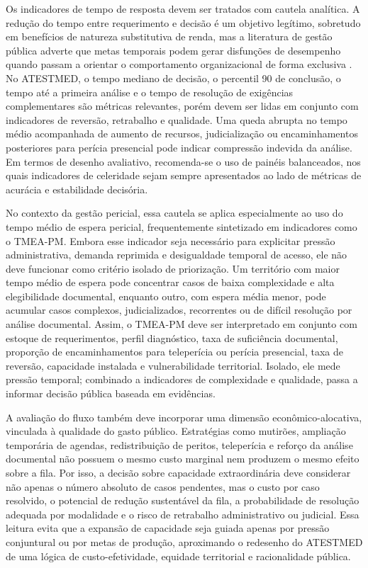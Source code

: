\documentclass[12pt,a4paper]{article}
\begin{document}
Os indicadores de tempo de resposta devem ser tratados com cautela analítica. A redução do tempo entre requerimento e decisão é um objetivo legítimo, sobretudo em benefícios de natureza substitutiva de renda, mas a literatura de gestão pública adverte que metas temporais podem gerar disfunções de desempenho quando passam a orientar o comportamento organizacional de forma exclusiva \parencite{kelman2009performanceimprovementandperformancedysfunctionanemp}. No ATESTMED, o tempo mediano de decisão, o percentil 90 de conclusão, o tempo até a primeira análise e o tempo de resolução de exigências complementares são métricas relevantes, porém devem ser lidas em conjunto com indicadores de reversão, retrabalho e qualidade. Uma queda abrupta no tempo médio acompanhada de aumento de recursos, judicialização ou encaminhamentos posteriores para perícia presencial pode indicar compressão indevida da análise. Em termos de desenho avaliativo, recomenda-se o uso de painéis balanceados, nos quais indicadores de celeridade sejam sempre apresentados ao lado de métricas de acurácia e estabilidade decisória.

No contexto da gestão pericial, essa cautela se aplica especialmente ao uso do tempo médio de espera pericial, frequentemente sintetizado em indicadores como o TMEA-PM. Embora esse indicador seja necessário para explicitar pressão administrativa, demanda reprimida e desigualdade temporal de acesso, ele não deve funcionar como critério isolado de priorização. Um território com maior tempo médio de espera pode concentrar casos de baixa complexidade e alta elegibilidade documental, enquanto outro, com espera média menor, pode acumular casos complexos, judicializados, recorrentes ou de difícil resolução por análise documental. Assim, o TMEA-PM deve ser interpretado em conjunto com estoque de requerimentos, perfil diagnóstico, taxa de suficiência documental, proporção de encaminhamentos para teleperícia ou perícia presencial, taxa de reversão, capacidade instalada e vulnerabilidade territorial. Isolado, ele mede pressão temporal; combinado a indicadores de complexidade e qualidade, passa a informar decisão pública baseada em evidências.

A avaliação do fluxo também deve incorporar uma dimensão econômico-alocativa, vinculada à qualidade do gasto público. Estratégias como mutirões, ampliação temporária de agendas, redistribuição de peritos, teleperícia e reforço da análise documental não possuem o mesmo custo marginal nem produzem o mesmo efeito sobre a fila. Por isso, a decisão sobre capacidade extraordinária deve considerar não apenas o número absoluto de casos pendentes, mas o custo por caso resolvido, o potencial de redução sustentável da fila, a probabilidade de resolução adequada por modalidade e o risco de retrabalho administrativo ou judicial. Essa leitura evita que a expansão de capacidade seja guiada apenas por pressão conjuntural ou por metas de produção, aproximando o redesenho do ATESTMED de uma lógica de custo-efetividade, equidade territorial e racionalidade pública.
\end{document}
